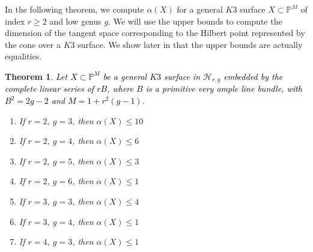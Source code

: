 \documentclass[11pt,twoside]{amsart}
\theoremstyle{plain}
\numberwithin{equation}{section}
\newtheorem{theorem}{Theorem}[section]
\theoremstyle{definition}
\begin{document}
In the following theorem, we compute $\alpha(X)$ for a general $K3$ surface $X \subset \mathbb{P}^M$ of index $r \geq 2$ and low genus $g$. We will use the upper bounds to compute the dimension of the tangent space corresponding to the Hilbert point represented by the cone over a $K3$ surface. We show later in  that the upper bounds are actually equalities. 

\begin{theorem}\label{ZL for lower genus $K3$ surfaces}
\textcolor{black}{Let $X \subset \mathbb{P}^{M}$ be a general $K3$ surface in $\mathcal{H}_{r,g}$ embedded by the complete linear series of $rB$, where $B$ is a primitive very ample line bundle, with $B^2 = 2g-2$ and $M = 1+r^2(g-1)$.}
 
    \begin{enumerate}
        \item \label{2,3} If $r = 2$, $g = 3$, then $\alpha(X) \leq 10$ %
        \item \label{2,4} If $r = 2$, $g = 4$, then $\alpha(X) \leq 6$ 
        \item \label{2,5} If $r = 2$, $g = 5$, then $\alpha(X) \leq 3$ 
        \item \label{2,6} If $r = 2$, $g = 6$, then $\alpha(X) \leq 1$ 
        \item \label{3,3} If $r = 3$, $g = 3$, then $\alpha(X) \leq 4$
        \item \label{3,4} If $r = 3$, $g = 4$, then $\alpha(X) \leq 1$ 
        \item \label{4,3} If $r = 4$, $g = 3$, then $\alpha(X) \leq 1$
        
       
        
    \end{enumerate}
    
\end{theorem}
\end{document}

